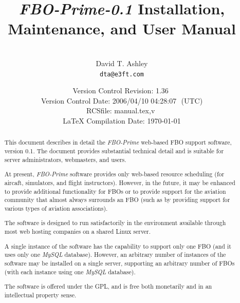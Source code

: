\documentclass[letterpaper,10pt,titlepage]{article}
\newcommand{\productbasename}{FBO-Prime}
\newcommand{\productversion}{0.1}
\newcommand{\productname}{\productbasename{}-\productversion}
\begin{document}
\title{\emph{\productname{}} Installation, Maintenance, and User Manual}
\author{\vspace{1cm}\\David T. Ashley\\\texttt{dta@e3ft.com}\\\vspace{1cm}}
\date{\vspace*{8mm}\small{Version Control $ $Revision: 1.36 $ $ \\
      Version Control $ $Date: 2006/04/10 04:28:07 $ $ (UTC) \\
      $ $RCSfile: manual.tex,v $ $ \\
      \LaTeX{} Compilation Date: \today{}}}
\maketitle

%
\begin{abstract}
This document describes in detail
the \emph{\productbasename{}} web-based
FBO support software, version \productversion{}\@. The
document provides substantial technical detail and is suitable
for server administrators, webmasters, and users.

At present, \emph{\productbasename{}} 
software provides only web-based resource
scheduling (for aircaft, simulators,
and flight instructors)\@.  However, in the future, it may be enhanced
to provide additional functionality for FBOs or
to provide support for the aviation community that almost
always surrounds an FBO (such as by providing support for various
types of aviation associations).

The software is designed to run satisfactorily in the environment
available through most web hosting companies on a shared
Linux server.

A single instance of the software has the capability to support only one FBO
(and it uses only one \emph{MySQL} database)\@.  However, an arbitrary number of
instances of the software may be installed on a single server, supporting an
arbitrary number of FBOs (with each instance using one \emph{MySQL} database).

The software is offered under the GPL, and is free
both monetarily and in an intellectual property sense.
\end{abstract}
\end{document}
